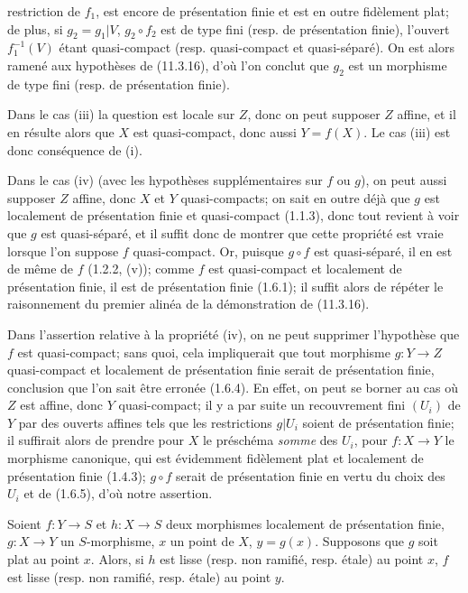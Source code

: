 
restriction de $f_1$, est encore de présentation finie et est en outre fidèlement plat; de plus, si $g_2=g_1|V$, $g_2\circ f_2$ est de type fini (resp. de présentation finie), l'ouvert $f_1^{-1}(V)$ étant quasi-compact (resp. quasi-compact et quasi-séparé). On est alors ramené aux hypothèses de (11.3.16), d'où l'on conclut que $g_2$ est un morphisme de type fini (resp. de présentation finie).

Dans le cas (iii) la question est locale sur $Z$, donc on peut supposer $Z$ affine, et il en résulte alors que $X$ est quasi-compact, donc aussi $Y=f(X)$. Le cas (iii) est donc conséquence de (i).

Dans le cas (iv) (avec les hypothèses supplémentaires sur $f$ ou $g$), on peut aussi supposer $Z$ affine, donc $X$ et $Y$ quasi-compacts; on sait en outre déjà que $g$ est localement de présentation finie et quasi-compact (1.1.3), donc tout revient à voir que $g$ est quasi-séparé, et il suffit donc de montrer que cette propriété est vraie lorsque l'on suppose $f$ quasi-compact. Or, puisque $g\circ f$ est quasi-séparé, il en est de même de $f$ (1.2.2, (v)); comme $f$ est quasi-compact et localement de présentation finie, il est de présentation finie (1.6.1); il suffit alors de répéter le raisonnement du premier alinéa de la démonstration de (11.3.16).

\begin{remark}[17.7.6]
\label{IV.17.7.6}
Dans l'assertion relative à la propriété (iv), on ne peut supprimer l'hypothèse que $f$ est quasi-compact; sans quoi, cela impliquerait que tout morphisme $g:Y\to Z$ quasi-compact et localement de présentation finie serait de présentation finie, conclusion que l'on sait être erronée (1.6.4). En effet, on peut se borner au cas où $Z$ est affine, donc $Y$ quasi-compact; il y a par suite un recouvrement fini $(U_i)$ de $Y$ par des ouverts affines tels que les restrictions $g|U_i$ soient de présentation finie; il suffirait alors de prendre pour $X$ le préschéma \emph{somme} des $U_i$, pour $f:X\to Y$ le morphisme canonique, qui est évidemment fidèlement plat et localement de présentation finie (1.4.3); $g\circ f$ serait de présentation finie en vertu du choix des $U_i$ et de (1.6.5), d'où notre assertion.
\end{remark}

\begin{proposition}[17.7.7]
\label{IV.17.7.7}
Soient $f:Y\to S$ et $h:X\to S$ deux morphismes localement de présentation finie, $g:X\to Y$ un $S$-morphisme, $x$ un point de $X$, $y=g(x)$. Supposons que $g$ soit plat au point $x$. Alors, si $h$ est lisse (resp. non ramifié, resp. étale) au point $x$, $f$ est lisse (resp. non ramifié, resp. étale) au point $y$.
\end{proposition}

